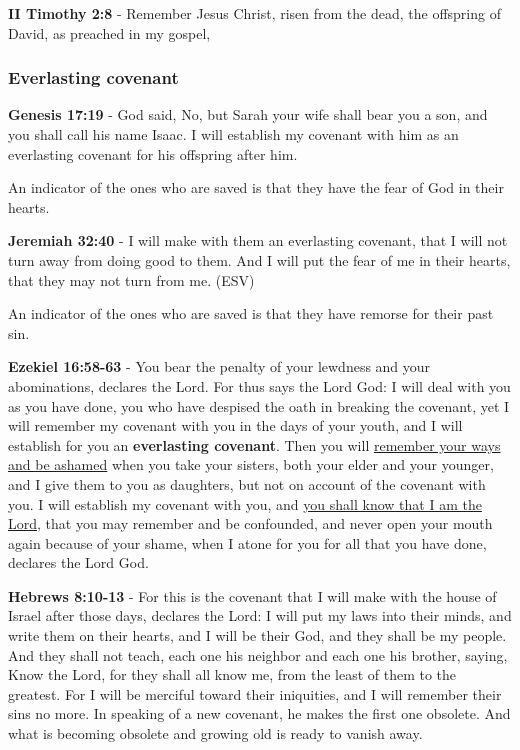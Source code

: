 \documentclass[11pt]{article}
\begin{document}
\textbf{II Timothy 2:8} - Remember Jesus Christ, risen from the dead, the offspring of David, as preached in my gospel,

\subsubsection{Everlasting covenant}
\label{sec:org5197783}
\textbf{Genesis 17:19} - God said, No, but Sarah your wife shall bear you a son, and you shall call his name Isaac. I will establish my covenant with him as an everlasting covenant for his offspring after him.􀧁

An indicator of the ones who are saved is that they have the fear of God in their hearts.

\textbf{Jeremiah 32:40} - I will make with them an everlasting covenant, that I will not turn away from doing good to them. And I will put the fear of me in their hearts, that they may not turn from me. (ESV)

An indicator of the ones who are saved is that they have remorse for their past sin.

\textbf{Ezekiel 16:58-63} - You bear the penalty of your lewdness and your abominations, declares the Lord.  For thus says the Lord God: I will deal with you as you have done, you who have despised the oath in breaking the covenant, yet I will remember my covenant with you in the days of your youth, and I will establish for you an \textbf{everlasting covenant}.  Then you will \uline{remember your ways and be ashamed} when you take your sisters, both your elder and your younger, and I give them to you as daughters, but not on account of the covenant with you.  I will establish my covenant with you, and \uline{you shall know that I am the Lord}, that you may remember and be confounded, and never open your mouth again because of your shame, when I atone for you for all that you have done, declares the Lord God.

\textbf{Hebrews 8:10-13} - For this is the covenant that I will make with the house of Israel after those days, declares the Lord: I will put my laws into their minds, and write them on their hearts, and I will be their God, and they shall be my people. And they shall not teach, each one his neighbor and each one his brother, saying, Know the Lord, for they shall all know me, from the least of them to the greatest. For I will be merciful toward their iniquities, and I will remember their sins no more. In speaking of a new covenant, he makes the first one obsolete. And what is becoming obsolete and growing old is ready to vanish away.
\end{document}
